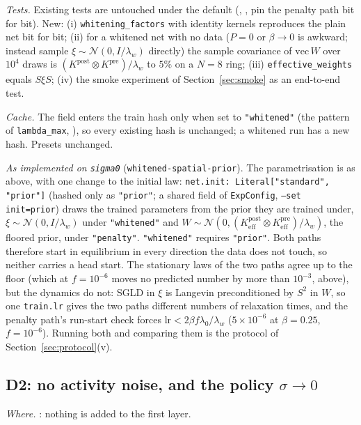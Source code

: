 \documentclass[11pt,a4paper]{article}
\newcommand{\code}[1]{\texttt{#1}}
\begin{document}
\emph{Tests.} Existing tests are untouched under the default (, ,  pin the penalty path bit for bit). New: (i) \code{whitening\_factors} with identity kernels reproduces the plain net bit for bit; (ii) for a whitened net with no data ($P = 0$ or $\beta\to0$ is awkward; instead sample $\xi\sim\mathcal N(0, I/\lambda_w)$ directly) the sample covariance of $\mathrm{vec}\,W$ over $10^4$ draws is $(K^{\mathrm{post}}\otimes K^{\mathrm{pre}})/\lambda_w$ to $5\%$ on a $N = 8$ ring; (iii) \code{effective\_weights} equals $S\xi S$; (iv) the smoke experiment of Section~\ref{sec:smoke} as an end-to-end test.

\emph{Cache.} The field enters the train hash only when set to \code{"whitened"} (the pattern of \code{lambda\_max}, ), so every existing hash is unchanged; a whitened run has a new hash. Presets unchanged.

\emph{As implemented on \code{sigma0}} (\code{whitened-spatial-prior}). The parametrisation is as above, with one change to the initial law: \code{net.init: Literal["standard", "prior"]} (hashed only as \code{"prior"}; a shared field of \code{ExpConfig}, \code{--set init=prior}) draws the trained parameters from the prior they are trained under, $\xi\sim\mathcal N(0, I/\lambda_w)$ under \code{"whitened"} and $W\sim\mathcal N(0, (K^{\mathrm{post}}_{\mathrm{eff}}\otimes K^{\mathrm{pre}}_{\mathrm{eff}})/\lambda_w)$, the floored prior, under \code{"penalty"}. \code{"whitened"} requires \code{"prior"}. Both paths therefore start in equilibrium in every direction the data does not touch, so neither carries a head start. The stationary laws of the two paths agree up to the floor (which at $f = 10^{-6}$ moves no predicted number by more than $10^{-3}$, above), but the dynamics do not: SGLD in $\xi$ is Langevin preconditioned by $S^2$ in $W$, so one \code{train.lr} gives the two paths different numbers of relaxation times, and the penalty path's run-start check forces $\mathrm{lr} < 2\beta f\lambda_0/\lambda_w$ ($5\times10^{-6}$ at $\beta = 0.25$, $f = 10^{-6}$). Running both and comparing them is the protocol of Section~\ref{sec:protocol}(v).

\subsection{D2: no activity noise, and the policy \texorpdfstring{$\sigma\to0$}{sigma -> 0}}
\label{sec:D2}
\emph{Where.} : nothing is added to the first layer.
\end{document}
